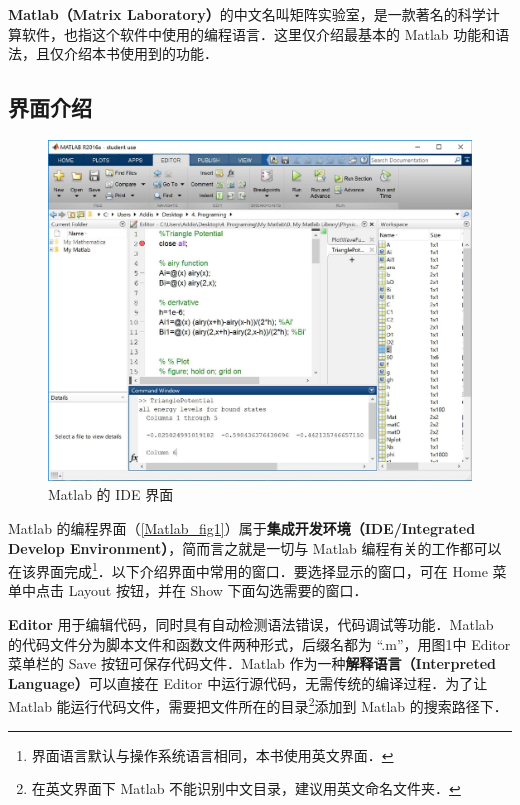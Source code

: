
\textbf{Matlab（Matrix Laboratory）}的中文名叫矩阵实验室，是一款著名的科学计算软件，也指这个软件中使用的编程语言．这里仅介绍最基本的 Matlab 功能和语法，且仅介绍本书使用到的功能．


\subsection{界面介绍}

\begin{figure}[ht]
\centering
\includegraphics[width= 14cm]{./figures/Matlab1.pdf}
\caption{Matlab 的 IDE 界面}\label{Matlab_fig1}
\end{figure}

Matlab 的编程界面（\autoref{Matlab_fig1}）属于\textbf{集成开发环境（IDE/Integrated Develop Environment）}，简而言之就是一切与 Matlab 编程有关的工作都可以在该界面完成\footnote{界面语言默认与操作系统语言相同，本书使用英文界面．}．以下介绍界面中常用的窗口．要选择显示的窗口，可在 Home 菜单中点击 Layout 按钮，并在 Show 下面勾选需要的窗口．

\textbf{Editor} 用于编辑代码，同时具有自动检测语法错误，代码调试等功能．Matlab 的代码文件分为脚本文件和函数文件两种形式，后缀名都为 “.m”，用图1中 Editor 菜单栏的 Save 按钮可保存代码文件．Matlab 作为一种\textbf{解释语言（Interpreted Language）}可以直接在 Editor 中运行源代码，无需传统的编译过程．为了让 Matlab 能运行代码文件，需要把文件所在的目录\footnote{在英文界面下 Matlab 不能识别中文目录，建议用英文命名文件夹．}添加到 Matlab 的搜索路径下．

